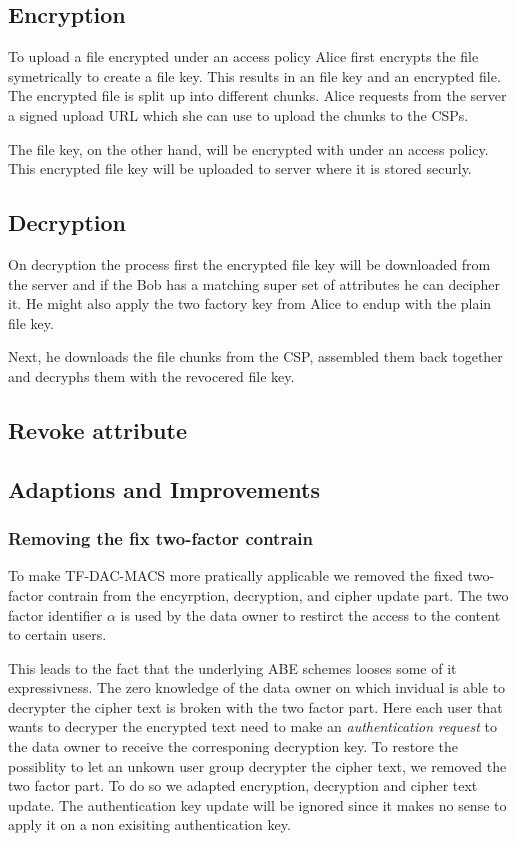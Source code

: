 \subsection{Encryption}
To upload a file encrypted under an access policy Alice first encrypts the file symetrically to create a file key. This results in an file key and an encrypted file. The encrypted file is split up into different chunks. Alice requests from the server a signed upload URL which she can use to upload the chunks to the CSPs. 

The file key, on the other hand, will be encrypted with under an access policy. This encrypted file key will be uploaded to server where it is stored securly. 

\subsection{Decryption}
On decryption the process first the encrypted file key will be downloaded from the server and if the Bob has a matching super set of attributes he can decipher it. He might also apply the two factory key from Alice to endup with the plain file key. 

Next, he downloads the file chunks from the CSP, assembled them back together and decryphs them with the revocered file key.

\subsection{Revoke attribute}


\subsection{Adaptions and Improvements}

\subsubsection{Removing the fix two-factor contrain}
To make \ac{TF-DAC-MACS} more pratically applicable we removed the fixed two-factor contrain from the encyrption, decryption, and cipher update part. The two factor identifier $\alpha$ is used by the data owner to restirct the access to the content to certain users. 

This leads to the fact that the underlying \ac{ABE} schemes looses some of it expressivness. The zero knowledge of the data owner on which invidual is able to decrypter the cipher text is broken with the two factor part. Here each user that wants to decryper the encrypted text need to make an \textit{authentication request} to the data owner to receive the corresponing decryption key. To restore the possiblity to let an unkown user group decrypter the cipher text, we removed the two factor part. To do so we adapted encryption, decryption and cipher text update. The authentication key update will be ignored since it makes no sense to apply it on a non exisiting authentication key. 

